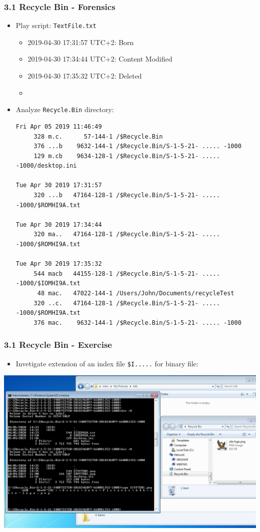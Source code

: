 \begin{frame}[fragile]
  \frametitle{3.1 Recycle Bin - Forensics}
    \begin{itemize}
        \item Play script: \texttt{TextFile.txt} 
            \begin{itemize}
		\item 2019-04-30 17:31:57 UTC+2:  Born
		\item 2019-04-30 17:34:44 UTC+2:  Content Modified
		\item 2019-04-30 17:35:32 UTC+2:  Deleted
		\item[]
            \end{itemize}
        \item Analyze \texttt{Recycle.Bin} directory:
  \begin{lstlisting}[basicstyle=\tiny]
Fri Apr 05 2019 11:46:49
     328 m.c.      57-144-1 /$Recycle.Bin
     376 ...b    9632-144-1 /$Recycle.Bin/S-1-5-21- ..... -1000
     129 m.cb    9634-128-1 /$Recycle.Bin/S-1-5-21- ..... -1000/desktop.ini

Tue Apr 30 2019 17:31:57
     320 ...b   47164-128-1 /$Recycle.Bin/S-1-5-21- ..... -1000/$ROMHI9A.txt

Tue Apr 30 2019 17:34:44
     320 ma..   47164-128-1 /$Recycle.Bin/S-1-5-21- ..... -1000/$ROMHI9A.txt

Tue Apr 30 2019 17:35:32
     544 macb   44155-128-1 /$Recycle.Bin/S-1-5-21- ..... -1000/$IOMHI9A.txt
      48 mac.   47022-144-1 /Users/John/Documents/recycleTest
     320 ..c.   47164-128-1 /$Recycle.Bin/S-1-5-21- ..... -1000/$ROMHI9A.txt
     376 mac.    9632-144-1 /$Recycle.Bin/S-1-5-21- ..... -1000
  \end{lstlisting}
    \end{itemize}
\end{frame}


\begin{frame}[fragile]
  \frametitle{3.1 Recycle Bin - Exercise}
    \begin{itemize}
	    \item[] Invetigate extension of an index file \texttt{\$I.....} for binary file:
    \end{itemize}
    \includegraphics[scale=.27]{images/recycleEx.png}
\end{frame}


